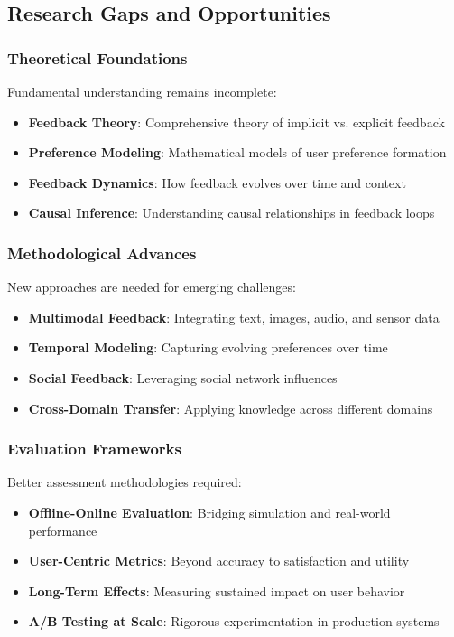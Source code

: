 \documentclass[acmsmall,review,anonymous]{acmart}
\begin{document}
\subsection{Research Gaps and Opportunities}

\subsubsection{Theoretical Foundations}

Fundamental understanding remains incomplete:

\begin{itemize}
    \item \textbf{Feedback Theory}: Comprehensive theory of implicit vs. explicit feedback
    \item \textbf{Preference Modeling}: Mathematical models of user preference formation
    \item \textbf{Feedback Dynamics}: How feedback evolves over time and context
    \item \textbf{Causal Inference}: Understanding causal relationships in feedback loops
\end{itemize}

\subsubsection{Methodological Advances}

New approaches are needed for emerging challenges:

\begin{itemize}
    \item \textbf{Multimodal Feedback}: Integrating text, images, audio, and sensor data
    \item \textbf{Temporal Modeling}: Capturing evolving preferences over time
    \item \textbf{Social Feedback}: Leveraging social network influences
    \item \textbf{Cross-Domain Transfer}: Applying knowledge across different domains
\end{itemize}

\subsubsection{Evaluation Frameworks}

Better assessment methodologies required:

\begin{itemize}
    \item \textbf{Offline-Online Evaluation}: Bridging simulation and real-world performance
    \item \textbf{User-Centric Metrics}: Beyond accuracy to satisfaction and utility
    \item \textbf{Long-Term Effects}: Measuring sustained impact on user behavior
    \item \textbf{A/B Testing at Scale}: Rigorous experimentation in production systems
\end{itemize}
\end{document}
